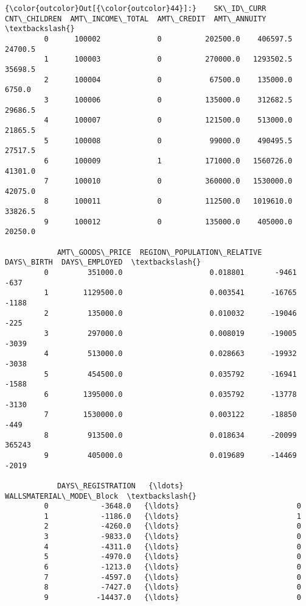 \documentclass[11pt]{article}
\begin{document}
\begin{Verbatim}[commandchars=\\\{\}]
{\color{outcolor}Out[{\color{outcolor}44}]:}    SK\_ID\_CURR  CNT\_CHILDREN  AMT\_INCOME\_TOTAL  AMT\_CREDIT  AMT\_ANNUITY  \textbackslash{}
         0      100002             0          202500.0    406597.5      24700.5   
         1      100003             0          270000.0   1293502.5      35698.5   
         2      100004             0           67500.0    135000.0       6750.0   
         3      100006             0          135000.0    312682.5      29686.5   
         4      100007             0          121500.0    513000.0      21865.5   
         5      100008             0           99000.0    490495.5      27517.5   
         6      100009             1          171000.0   1560726.0      41301.0   
         7      100010             0          360000.0   1530000.0      42075.0   
         8      100011             0          112500.0   1019610.0      33826.5   
         9      100012             0          135000.0    405000.0      20250.0   
         
            AMT\_GOODS\_PRICE  REGION\_POPULATION\_RELATIVE  DAYS\_BIRTH  DAYS\_EMPLOYED  \textbackslash{}
         0         351000.0                    0.018801       -9461           -637   
         1        1129500.0                    0.003541      -16765          -1188   
         2         135000.0                    0.010032      -19046           -225   
         3         297000.0                    0.008019      -19005          -3039   
         4         513000.0                    0.028663      -19932          -3038   
         5         454500.0                    0.035792      -16941          -1588   
         6        1395000.0                    0.035792      -13778          -3130   
         7        1530000.0                    0.003122      -18850           -449   
         8         913500.0                    0.018634      -20099         365243   
         9         405000.0                    0.019689      -14469          -2019   
         
            DAYS\_REGISTRATION   {\ldots}    WALLSMATERIAL\_MODE\_Block  \textbackslash{}
         0            -3648.0   {\ldots}                           0   
         1            -1186.0   {\ldots}                           1   
         2            -4260.0   {\ldots}                           0   
         3            -9833.0   {\ldots}                           0   
         4            -4311.0   {\ldots}                           0   
         5            -4970.0   {\ldots}                           0   
         6            -1213.0   {\ldots}                           0   
         7            -4597.0   {\ldots}                           0   
         8            -7427.0   {\ldots}                           0   
         9           -14437.0   {\ldots}                           0   
         

\end{Verbatim}
\end{document}
